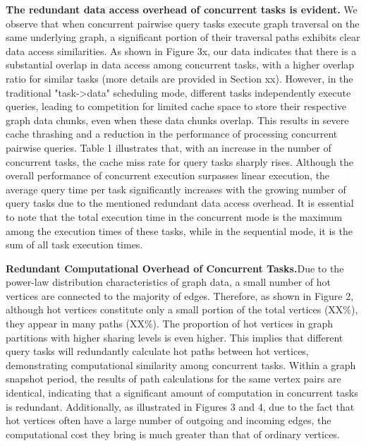 \documentclass[lettersize,journal]{IEEEtran} %
\begin{document}
{\bf{The redundant data access overhead of concurrent tasks is evident.}} We observe that when concurrent pairwise query tasks execute graph traversal on the same underlying graph, a significant portion of their traversal paths exhibits clear data access similarities. As shown in Figure 3x, our data indicates that there is a substantial overlap in data access among concurrent tasks, with a higher overlap ratio for similar tasks (more details are provided in Section xx). However, in the traditional "task->data" scheduling mode, different tasks independently execute queries, leading to competition for limited cache space to store their respective graph data chunks, even when these data chunks overlap. This results in severe cache thrashing and a reduction in the performance of processing concurrent pairwise queries. Table 1 illustrates that, with an increase in the number of concurrent tasks, the cache miss rate for query tasks sharply rises. Although the overall performance of concurrent execution surpasses linear execution, the average query time per task significantly increases with the growing number of query tasks due to the mentioned redundant data access overhead. It is essential to note that the total execution time in the concurrent mode is the maximum among the execution times of these tasks, while in the sequential mode, it is the sum of all task execution times.


{\bf{Redundant Computational Overhead of Concurrent Tasks.}}Due to the power-law distribution characteristics of graph data, a small number of hot vertices are connected to the majority of edges. Therefore, as shown in Figure 2, although hot vertices constitute only a small portion of the total vertices (XX\%), they appear in many paths (XX\%). The proportion of hot vertices in graph partitions with higher sharing levels is even higher. This implies that different query tasks will redundantly calculate hot paths between hot vertices, demonstrating computational similarity among concurrent tasks. Within a graph snapshot period, the results of path calculations for the same vertex pairs are identical, indicating that a significant amount of computation in concurrent tasks is redundant. Additionally, as illustrated in Figures 3 and 4, due to the fact that hot vertices often have a large number of outgoing and incoming edges, the computational cost they bring is much greater than that of ordinary vertices.
\end{document}
